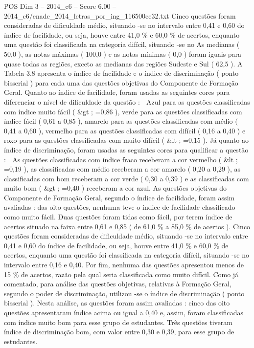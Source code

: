 \begin{textsample}{POS Dim 3 – 2014\_c6 – Score 6.00 – 2014\_c6/enade\_2014\_letras\_por\_ing\_116500ce32.txt}
Cinco questões foram consideradas de dificuldade médio, situando -se no intervalo entre 0,41 e 0,60 do índice de facilidade, ou seja, houve entre 41,0 \% e 60,0 \% de acertos, enquanto uma questão foi classificada na categoria difícil, situando -se no As medianas ( 50,0 ), as notas máximas ( 100,0 ) e as notas mínimas ( 0,0 ) foram iguais para quase todas as regiões, exceto as medianas das regiões Sudeste e Sul ( 62,5 ).
A Tabela 3.8 apresenta o índice de facilidade e o índice de discriminação ( ponto bisserial ) para cada uma das questões objetivas do Componente de Formação Geral.
Quanto ao índice de facilidade, foram usadas as seguintes cores para diferenciar o nível de dificuldade da questão :  Azul para as questões classificadas com índice muito fácil ( \&gt ; =0,86 ), verde para as questões classificadas com índice fácil ( 0,61 a 0,85 ), amarelo para as questões classificadas com médio ( 0,41 a 0,60 ), vermelho para as questões classificadas com difícil ( 0,16 a 0,40 ) e roxo para as questões classificadas com muito difícil ( \&lt ; =0,15 ).
Já quanto ao índice de discriminação, foram usadas as seguintes cores para qualificar a questão :  As questões classificadas com índice fraco receberam a cor vermelho ( \&lt ; =0,19 ), as classificadas com médio receberam a cor amarelo ( 0,20 a 0,29 ), as classificadas com bom receberam a cor verde ( 0,30 a 0,39 ) e as classificadas com muito bom ( \&gt ; =0,40 ) receberam a cor azul.
As questões objetivas do Componente de Formação Geral, segundo o índice de facilidade, foram assim avaliadas : das oito questões, nenhuma teve o índice de facilidade classificado como muito fácil.
Duas questões foram tidas como fácil, por terem índice de acertos situado na faixa entre 0,61 e 0,85 ( de 61,0 \% a 85,0 \% de acertos ).
Cinco questões foram consideradas de dificuldade médio, situando -se no intervalo entre 0,41 e 0,60 do índice de facilidade, ou seja, houve entre 41,0 \% e 60,0 \% de acertos, enquanto uma questão foi classificada na categoria difícil, situando -se no intervalo entre 0,16 e 0,40.
Por fim, nenhuma das questões apresentou menos de 15 \% de acertos, razão pela qual seria classificada como muito difícil.
Como já comentado, para análise das questões objetivas, relativas à Formação Geral, segundo o poder de discriminação, utilizou -se o índice de discriminação ( ponto bisserial ).
Nesta análise, as questões foram assim avaliadas : cinco das oito questões apresentaram índice acima ou igual a 0,40 e, assim, foram classificadas com índice muito bom para esse grupo de estudantes.
Três questões tiveram índice de discriminação bom, com valor entre 0,30 e 0,39, para esse grupo de estudantes.

\end{textsample}
